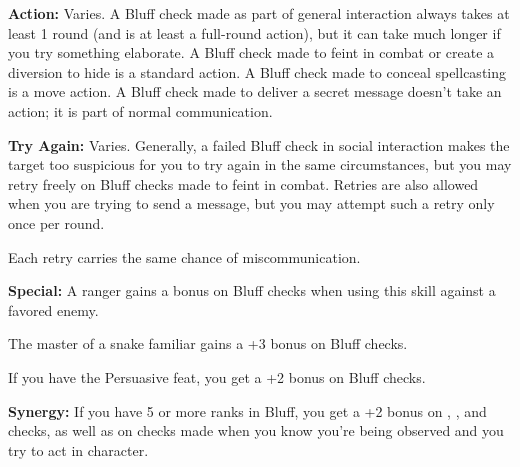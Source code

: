 \textbf{Action:} Varies. A Bluff check made as part of general interaction always takes at least 1 round (and is at least a full-round action), but it can take much longer if you try something elaborate. A Bluff check made to feint in combat or create a diversion to hide is a standard action. A Bluff check made to conceal spellcasting is a move action. A Bluff check made to deliver a secret message doesn't take an action; it is part of normal communication.

\textbf{Try Again:} Varies. Generally, a failed Bluff check in social interaction makes the target too suspicious for you to try again in the same circumstances, but you may retry freely on Bluff checks made to feint in combat. Retries are also allowed when you are trying to send a message, but you may attempt such a retry only once per round.

Each retry carries the same chance of miscommunication.

\textbf{Special:} A ranger gains a bonus on Bluff checks when using this skill against a favored enemy.

The master of a snake familiar gains a +3 bonus on Bluff checks.

If you have the Persuasive feat, you get a +2 bonus on Bluff checks.

\textbf{Synergy:} If you have 5 or more ranks in Bluff, you get a +2 bonus on , , and  checks, as well as on  checks made when you know you're being observed and you try to act in character.

